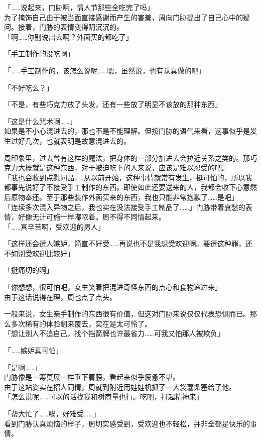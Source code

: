 「……说起来，门胁啊，情人节那些全吃完了吗」\\

为了掩饰自己由于被当面直接感谢而产生的害羞，周向门胁提出了自己心中的疑问。接着，门胁的表情变得阴沉沉的。\\

「啊……你别说出去啊？外面买的都吃了」

「手工制作的没吃啊」

「……手工制作的，该怎么说呢……嗯，虽然说，也有认真做的吧」

「不好吃么？」

「不是，有些巧克力放了头发，还有一些放了明显不该放的那种东西」

「这是什么咒术啊……」\\

如果是不小心混进去的，那也不是不能理解。但按门胁的语气来看，这事似乎是发生过好几次，也就表明是故意混进去的。

周印象里，过去曾有这样的魔法，把身体的一部分加进去会拉近关系之类的。那巧克力大概就是这种东西，对于被迫吃下的人来说，应该是难以忍受的吧。\\

「我也会收到点慰问品……从以前开始，这种事情就常有发生，挺可怕的，所以我都事先说好了不接受手工制作的东西。即使如此还要送来的人，我都会收下心意然后原物奉还。至于那些装作外面买来的东西，我也只能非常抱歉了……是吧」\\

「连续多次混入异物之后，我也实在没法接受手工制品了……」门胁带着哀愁的表情，好像无计可施一样嘟哝着。周不得不同情起来。\\

「……真辛苦啊，受欢迎的男人」

「这样还会遭人嫉妒，简直不好受……再说也不是我想受欢迎啊。要遭这种罪，还不如别受欢迎比较好」

「挺痛切的啊」

「你想想，很可怕吧，女生笑着把混进奇怪东西的点心和食物递过来」\\

由于这话说得在理，周也点了点头。

一般来说，女生亲手制作的东西很有价值，但这对门胁来说仅仅代表恐惧而已。那么多次稀有的体验翻来覆去，实在是太可怜了。\\

「想让别人不追自己，找个挡箭牌也许最省力……可我又怕那人被欺负」

「……嫉妒真可怕」

「是啊……」\\

门胁像是一筹莫展一样垂下肩膀，看起来似乎疲惫不堪。\\

由于这站姿实在招人同情，周就到附近用娃娃机抓了一大袋薯条塞给了他。\\

「怎么说呢……可以的话找我和树商量也行。吃吧，打起精神来」

「帮大忙了……唉，好难受……」\\

看到门胁认真烦恼的样子，周切实感受到，受欢迎也不轻松，并非全都是快乐的事情。
